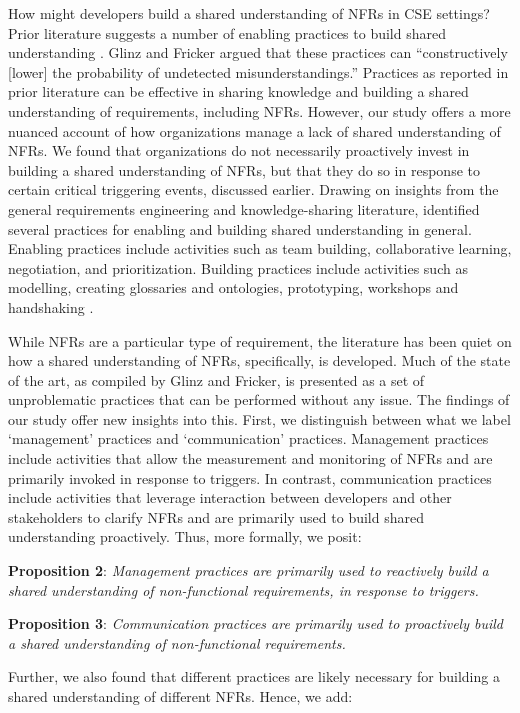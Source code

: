 \documentclass[smallextended]{svjour3}
\newcommand\cwproposition[2]{
\normalsize 
\vspace{0.5em}%
\noindent \textbf{\sffamily\fontsize{9}{11}\selectfont Proposition #1}: \textit{#2}
\vspace{0.5em}
}
\begin{document}
How might developers \textmd{build} a shared understanding of NFRs in CSE settings? 
Prior literature suggests a number of enabling practices to build shared understanding \citep{glinz_shared_2015}. Glinz and Fricker argued that these practices can \textmd{``constructively [lower] the probability of undetected misunderstandings.''} Practices as reported in prior literature can be effective in sharing knowledge and building a shared understanding of requirements, including NFRs. However, our study offers a more nuanced account of how organizations manage a lack of shared understanding of NFRs. We found that organizations do not necessarily proactively invest in building a shared understanding of NFRs, but that they do so in response to certain critical triggering events, discussed earlier. 
Drawing on insights from the general requirements engineering and knowledge-sharing literature, \citet{glinz_shared_2015} identified several practices for enabling and building shared understanding in general. Enabling practices include activities such as team building, collaborative learning, negotiation, and prioritization. Building practices include activities such as modelling, creating glossaries and ontologies, prototyping, workshops and handshaking \citep{glinz_shared_2015}. 

While NFRs are a particular type of requirement, the literature has been quiet on how a shared understanding of NFRs, specifically, is developed. Much of the state of the art, as compiled by Glinz and Fricker, is presented as a set of unproblematic practices that can be performed without any issue. The findings of our study offer new insights into this. 
First, we distinguish between what we label \textmd{`management'} practices and \textmd{`communication'} practices. Management practices include activities that allow the measurement and monitoring of NFRs and are primarily invoked in response to triggers. In contrast, communication practices include activities that leverage interaction between developers and other stakeholders to clarify NFRs and are primarily used to build shared understanding proactively. Thus, more formally, we posit:

\cwproposition{2}{Management practices are primarily used to reactively build a shared understanding of non-functional requirements, in response to triggers.}


\cwproposition{3}{Communication practices are primarily used to proactively build a shared understanding of non-functional requirements.}
%
Further, we also found that different practices are likely necessary for building a shared understanding of different NFRs. Hence, we add:
\end{document}
